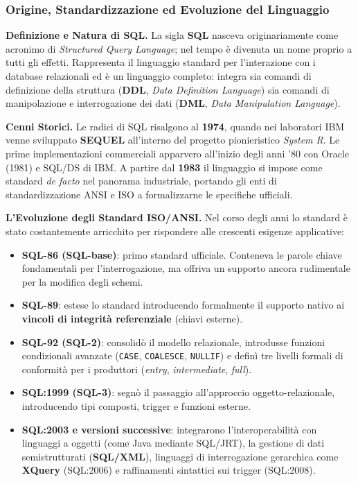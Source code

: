 \documentclass[12pt]{extarticle}
\begin{document}
\subsubsection{Origine, Standardizzazione ed Evoluzione del Linguaggio}
\noindent \textbf{Definizione e Natura di SQL.} La sigla \textbf{SQL} nasceva originariamente come acronimo di \textit{Structured Query Language}; nel tempo è divenuta un nome proprio a tutti gli effetti. Rappresenta il linguaggio standard per l'interazione con i database relazionali ed è un linguaggio completo: integra sia comandi di definizione della struttura (\textbf{DDL}, \textit{Data Definition Language}) sia comandi di manipolazione e interrogazione dei dati (\textbf{DML}, \textit{Data Manipulation Language}).

\medskip
\noindent \textbf{Cenni Storici.} Le radici di SQL risalgono al \textbf{1974}, quando nei laboratori IBM venne sviluppato \textbf{SEQUEL} all'interno del progetto pionieristico \textit{System R}. Le prime implementazioni commerciali apparvero all'inizio degli anni '80 con Oracle (1981) e SQL/DS di IBM. A partire dal \textbf{1983} il linguaggio si impose come standard \textit{de facto} nel panorama industriale, portando gli enti di standardizzazione ANSI e ISO a formalizzarne le specifiche ufficiali.

\medskip
\noindent \textbf{L'Evoluzione degli Standard ISO/ANSI.} Nel corso degli anni lo standard è stato costantemente arricchito per rispondere alle crescenti esigenze applicative:
\begin{itemize}
    \item \textbf{SQL-86 (SQL-base)}: primo standard ufficiale. Conteneva le parole chiave fondamentali per l'interrogazione, ma offriva un supporto ancora rudimentale per la modifica degli schemi.
    \item \textbf{SQL-89}: estese lo standard introducendo formalmente il supporto nativo ai \textbf{vincoli di integrità referenziale} (chiavi esterne).
    \item \textbf{SQL-92 (SQL-2)}: consolidò il modello relazionale, introdusse funzioni condizionali avanzate (\texttt{CASE}, \texttt{COALESCE}, \texttt{NULLIF}) e definì tre livelli formali di conformità per i produttori (\textit{entry}, \textit{intermediate}, \textit{full}).
    \item \textbf{SQL:1999 (SQL-3)}: segnò il passaggio all'approccio oggetto-relazionale, introducendo tipi composti, trigger e funzioni esterne.
    \item \textbf{SQL:2003 e versioni successive}: integrarono l'interoperabilità con linguaggi a oggetti (come Java mediante SQL/JRT), la gestione di dati semistrutturati (\textbf{SQL/XML}), linguaggi di interrogazione gerarchica come \textbf{XQuery} (SQL:2006) e raffinamenti sintattici sui trigger (SQL:2008).
\end{itemize}
\end{document}
